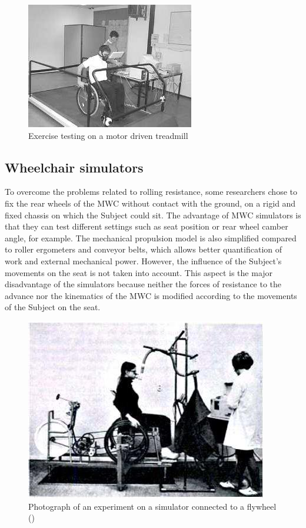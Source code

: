 \begin{figure}[h]
\center
\includegraphics[scale = 40]{images/tapi_roulant}
\caption{ Exercise testing on a motor driven treadmill \cite{van2006manual}}
\label{tapi_roulant}
\end{figure}

\subsection{Wheelchair simulators}
To overcome the problems related to rolling resistance, some researchers chose to fix the rear wheels of the MWC without contact with the ground, on a rigid and fixed chassis on which the Subject could sit. The advantage of MWC simulators is that they can test different settings such as seat position or rear wheel camber angle, for example. The mechanical propulsion model is also simplified compared to roller ergometers and conveyor belts, which allows better quantification of work and external mechanical power.   However, the influence of the Subject's movements on the seat is not taken into account. This aspect is the major disadvantage of the simulators because neither the forces of resistance to the advance nor the kinematics of the MWC is modified according to the movements of the Subject on the seat.

\begin{figure}[h]
\center
\includegraphics[scale = 30]{images/SFR}
\caption{Photograph of an experiment on a simulator connected to a flywheel (\cite{brattgaard1970energy})}
\label{SFR}
\end{figure}

